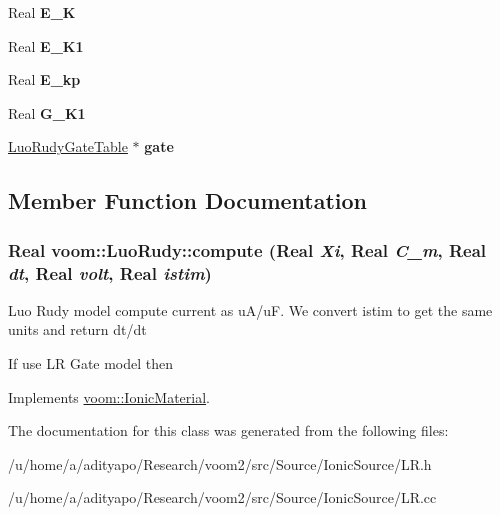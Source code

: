 \begin{DoxyCompactItemize}
\item 
\hypertarget{classvoom_1_1_luo_rudy_a1714aa5e2bab1022c1de022d8c776217}{
Real {\bfseries E\_\-K}}
\label{classvoom_1_1_luo_rudy_a1714aa5e2bab1022c1de022d8c776217}

\item 
\hypertarget{classvoom_1_1_luo_rudy_ab3d362f1f10fda458f29a163690c966e}{
Real {\bfseries E\_\-K1}}
\label{classvoom_1_1_luo_rudy_ab3d362f1f10fda458f29a163690c966e}

\item 
\hypertarget{classvoom_1_1_luo_rudy_a9886c66b06535e6363d5b02de6a0fa36}{
Real {\bfseries E\_\-kp}}
\label{classvoom_1_1_luo_rudy_a9886c66b06535e6363d5b02de6a0fa36}

\item 
\hypertarget{classvoom_1_1_luo_rudy_a2b431b18716682153eac9138badcae71}{
Real {\bfseries G\_\-K1}}
\label{classvoom_1_1_luo_rudy_a2b431b18716682153eac9138badcae71}

\item 
\hypertarget{classvoom_1_1_luo_rudy_a6bd41f999aa8deec3aa212b5850690ea}{
\hyperlink{class_luo_rudy_gate_table}{LuoRudyGateTable} $\ast$ {\bfseries gate}}
\label{classvoom_1_1_luo_rudy_a6bd41f999aa8deec3aa212b5850690ea}

\end{DoxyCompactItemize}


\subsection{Member Function Documentation}
\hypertarget{classvoom_1_1_luo_rudy_a183e2b1a92b358944679f9e07e38c4be}{
\subsubsection[{compute}]{\setlength{\rightskip}{0pt plus 5cm}Real voom::LuoRudy::compute (Real {\em Xi}, \/  Real {\em C\_\-m}, \/  Real {\em dt}, \/  Real {\em volt}, \/  Real {\em istim})}}
\label{classvoom_1_1_luo_rudy_a183e2b1a92b358944679f9e07e38c4be}
Luo Rudy model compute current as uA/uF. We convert istim to get the same units and return dt/dt 

If use LR Gate model then 

Implements \hyperlink{classvoom_1_1_ionic_material_a1b95cf90af115374b428f2e5ece571cb}{voom::IonicMaterial}.

The documentation for this class was generated from the following files:\begin{DoxyCompactItemize}
\item 
/u/home/a/adityapo/Research/voom2/src/Source/IonicSource/LR.h\item 
/u/home/a/adityapo/Research/voom2/src/Source/IonicSource/LR.cc\end{DoxyCompactItemize}
